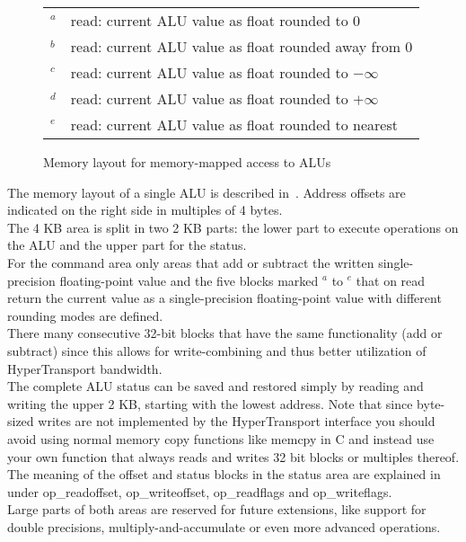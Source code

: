 \begin{figure}[ht]
\begin{center}

\label{fig:memlayout}
\caption{Memory layout for memory-mapped access to ALUs}
\begin{tabular}{ll}
$^a$ & read: current ALU value as float rounded to $0$\\
$^b$ & read: current ALU value as float rounded away from $0$\\
$^c$ & read: current ALU value as float rounded to $-\infty$\\
$^d$ & read: current ALU value as float rounded to $+\infty$\\
$^e$ & read: current ALU value as float rounded to nearest\\
\end{tabular}
\end{center}
\end{figure}

The memory layout of a single ALU is described in~.
Address offsets are indicated on the right side in multiples of 4 bytes.\\
The 4 KB area is split in two 2 KB parts: the lower part to execute operations
on the ALU and the upper part for the status.\\
For the command area only areas that add or subtract the written single-precision
floating-point value and the five blocks marked $^a$ to $^e$ that on read
return the current value as a single-precision floating-point value with different
rounding modes are defined.\\
There many consecutive 32-bit blocks that have the same functionality
(add or subtract) since this allows for write-combining and thus better
utilization of HyperTransport bandwidth.\\
The complete ALU status can be saved and restored simply by reading and writing
the upper 2 KB, starting with the lowest address. Note that since byte-sized
writes are not implemented by the HyperTransport interface you should avoid
using normal memory copy functions like memcpy in C and instead use your own
function that always reads and writes 32 bit blocks or multiples thereof.\\
The meaning of the offset and status blocks in the status area are explained
in~ under op\_readoffset, op\_writeoffset, op\_readflags
and op\_writeflags.\\
Large parts of both areas are reserved for future extensions, like support for
double precisions, multiply-and-accumulate or even more advanced operations.\\

